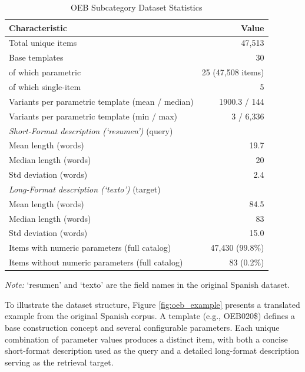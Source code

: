 \documentclass[preprint,review,12pt]{elsarticle}
\begin{document}
\begin{table}[ht]
\centering
\caption{OEB Subcategory Dataset Statistics}
\label{tab:dataset_statistics}
\begin{tabular}{lr}
\toprule
\textbf{Characteristic} & \textbf{Value} \\
\midrule
Total unique items & 47,513 \\
Base templates & 30 \\
\quad of which parametric & 25 (47,508 items) \\
\quad of which single-item & 5 \\
Variants per parametric template (mean / median) & 1900.3 / 144 \\
Variants per parametric template (min / max) & 3 / 6,336 \\
\midrule
\textit{Short-Format description (`resumen')} (query) & \\
\quad Mean length (words) & 19.7 \\
\quad Median length (words) & 20 \\
\quad Std deviation (words) & 2.4 \\
\midrule
\textit{Long-Format description (`texto')} (target) & \\
\quad Mean length (words) & 84.5 \\
\quad Median length (words) & 83 \\
\quad Std deviation (words) & 15.0 \\
\midrule
Items with numeric parameters (full catalog) & 47,430 (99.8\%) \\
Items without numeric parameters (full catalog) & 83 (0.2\%) \\
\bottomrule
\end{tabular}
\end{table}
\smallskip
\small\textit{Note:} `resumen' and `texto' are the field names in the original Spanish dataset.
\smallskip

To illustrate the dataset structure, Figure \ref{fig:oeb_example} presents a translated example from the original Spanish corpus. A template (e.g., OEB020\$) defines a base construction concept and several configurable parameters. Each unique combination of parameter values produces a distinct item, with both a concise short-format description used as the query and a detailed long-format description serving as the retrieval target.
\end{document}

